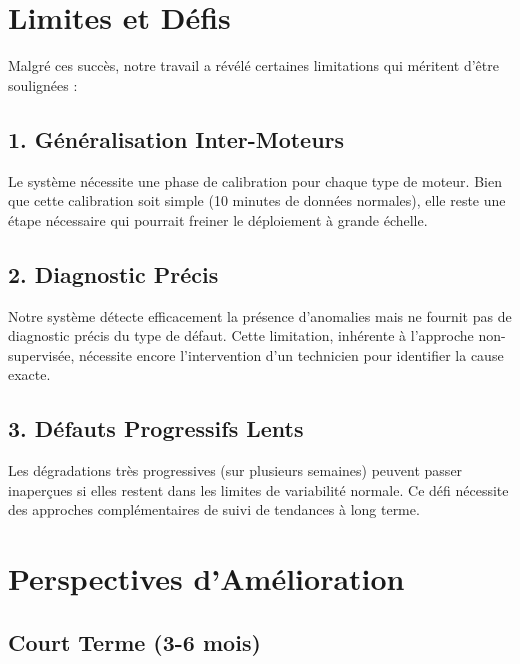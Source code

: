 \section*{Limites et Défis}

Malgré ces succès, notre travail a révélé certaines limitations qui méritent d'être soulignées :

\subsection*{1. Généralisation Inter-Moteurs}

Le système nécessite une phase de calibration pour chaque type de moteur. Bien que cette calibration soit simple (10 minutes de données normales), elle reste une étape nécessaire qui pourrait freiner le déploiement à grande échelle.

\subsection*{2. Diagnostic Précis}

Notre système détecte efficacement la présence d'anomalies mais ne fournit pas de diagnostic précis du type de défaut. Cette limitation, inhérente à l'approche non-supervisée, nécessite encore l'intervention d'un technicien pour identifier la cause exacte.

\subsection*{3. Défauts Progressifs Lents}

Les dégradations très progressives (sur plusieurs semaines) peuvent passer inaperçues si elles restent dans les limites de variabilité normale. Ce défi nécessite des approches complémentaires de suivi de tendances à long terme.

\section*{Perspectives d'Amélioration}

\subsection*{Court Terme (3-6 mois)}

